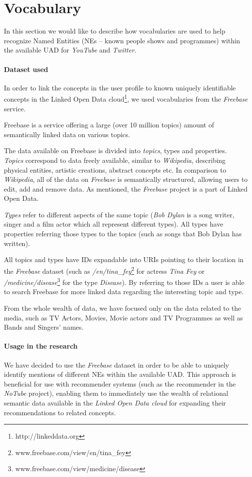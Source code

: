\section{Vocabulary}
In this section we would like to describe how vocabularies are used to help
recognize Named Entities (NEs -- known people shows and programmes) within
the available UAD for \textit{YouTube} and \textit{Twitter}.

\paragraph{Dataset used}
In order to link the concepts in the user profile to known uniquely identifiable concepts in the Linked Open Data
cloud\footnote{http://linkeddata.org}, we used vocabularies from the \textit{Freebase} service.

Freebase is a service offering a large (over 10 million topics) amount of semantically linked data on various topics.

The data available on Freebase is divided into \textit{topics}, types and properties. \textit{Topics} correspond to data
freely available, similar to \textit{Wikipedia}, describing physical entities, artistic creations, abstract concepts
etc. In comparison to \textit{Wikipedia}, all of the data on \textit{Freebase} is semantically structured,
allowing users to edit, add and remove data. As mentioned, the \textit{Freebase} project is a part of Linked Open Data.

\textit{Types} refer to different aspects of the same topic (\eg \textit{Bob Dylan} is a song writer,
singer and a film actor which all represent different types). All types have properties referring those
types to the topics (such as songs that Bob Dylan has written).

All topics and types have IDs expandable into URIs pointing to their location in the \textit{Freebase} dataset
(such as \textit{/en/tina\_fey}\footnote{www.freebase.com/view/en/tina\_fey} for actress \textit{Tina Fey}
or \textit{/medicine/disease}\footnote{www.freebase.com/view/medicine/disease} for the type \textit{Disease}).
By referring to those IDs a user is able to search Freebase for more linked data regarding the interesting topic and type.

From the whole wealth of data, we have focused only on the data related to the media, such as TV Actors, Movies, Movie
actors and TV Programmes as well as Bands and Singers' names.

\paragraph{Usage in the research}
We have decided to use the \textit{Freebase} dataset in order to be able to uniquely identify mentions of different NEs
within the available UAD. This approach is beneficial for use with recommender systems (such as the recommender
in the \textit{NoTube} project), enabling them to immediately use the wealth of relational semantic data available
in the \textit{Linked Open Data cloud} for expanding their recommendations to related concepts.
